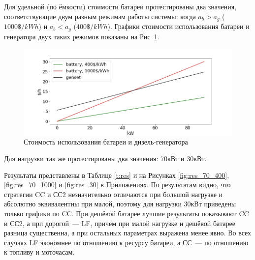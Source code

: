 Для удельной (по ёмкости) стоимости батареи протестированы два значения, соответствующие двум разным режимам работы системы: когда $a_b > a_g$ ($1000\$/kWh$) и $a_b < a_g$ ($400\$/kWh$).
Графики стоимости использования батареи и генератора двух таких режимов показаны на Рис~\ref{fig:bgcost}.


\begin{figure}[h]
\includegraphics[scale=0.5]{energy_cost.jpeg}
\caption{Стоимость использования батареи и дизель-генератора}
\centering
\label{fig:bgcost}
\end{figure}

\medskip

Для нагрузки так же протестированы два значения: 70кВт и 30кВт.

Результаты представлены в Таблице \ref{t:res} и на Рисунках \ref{fig:res_70_400}, \ref{fig:res_70_1000} и \ref{fig:res_30} в Приложениях.
По результатам видно, что стратегии CC и СС2 незначительно отличаются при большой нагрузке и абсолютно эквивалентны при малой, поэтому для нагрузки 30кВт приведены только графики по CC. 
При дешёвой батарее лучшие результаты показывают CC и СС2, а при дорогой~--- LF, причем при малой нагрузке и дешёвой батарее разница существенна, а при остальных параметрах выражена менее явно.
Во всех случаях LF экономнее по отношению к ресурсу батареи, а СС~--- по отношению к топливу и моточасам.


